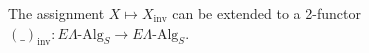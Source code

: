 \documentclass{amsbook} %
\newenvironment{eq*}{\begin{equation*}}{\end{equation*}}
\numberwithin{section}{chapter}
\begin{document}
\begin{prop} \label{invprop} The assignment $X \mapsto X_{\mathrm{inv}}$ can be extended to a 2-functor $(\_)_{\mathrm{inv}}: E\Lambda\mbox{-}\mathrm{Alg}_S \to E\Lambda\mbox{-}\mathrm{Alg}_S$.
\end{prop}
\end{document}

